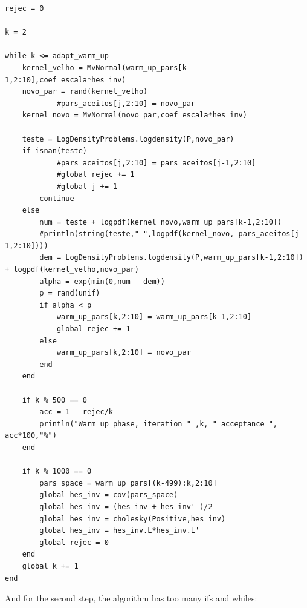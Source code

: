 \documentclass[12pt,a4paper]{article}
\begin{document}
\begin{verbatim}
rejec = 0

k = 2

while k <= adapt_warm_up
    kernel_velho = MvNormal(warm_up_pars[k-1,2:10],coef_escala*hes_inv)
    novo_par = rand(kernel_velho)
            #pars_aceitos[j,2:10] = novo_par
    kernel_novo = MvNormal(novo_par,coef_escala*hes_inv)

    teste = LogDensityProblems.logdensity(P,novo_par)
    if isnan(teste)
            #pars_aceitos[j,2:10] = pars_aceitos[j-1,2:10]
            #global rejec += 1
            #global j += 1
        continue
    else
        num = teste + logpdf(kernel_novo,warm_up_pars[k-1,2:10])
        #println(string(teste," ",logpdf(kernel_novo, pars_aceitos[j-1,2:10])))
        dem = LogDensityProblems.logdensity(P,warm_up_pars[k-1,2:10]) + logpdf(kernel_velho,novo_par)
        alpha = exp(min(0,num - dem))
        p = rand(unif)
        if alpha < p
            warm_up_pars[k,2:10] = warm_up_pars[k-1,2:10]
            global rejec += 1
        else
            warm_up_pars[k,2:10] = novo_par
        end
    end

    if k % 500 == 0
        acc = 1 - rejec/k
        println("Warm up phase, iteration " ,k, " acceptance ", acc*100,"%")
    end

    if k % 1000 == 0
        pars_space = warm_up_pars[(k-499):k,2:10]
        global hes_inv = cov(pars_space)
        global hes_inv = (hes_inv + hes_inv' )/2
        global hes_inv = cholesky(Positive,hes_inv)
        global hes_inv = hes_inv.L*hes_inv.L'
        global rejec = 0
    end
    global k += 1
end

\end{verbatim}
And for the second step, the algorithm has too many ifs and whiles:
\end{document}
